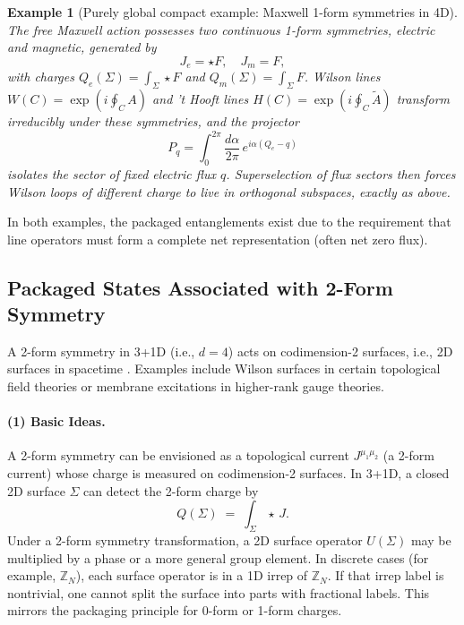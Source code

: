 \documentclass[12pt,a4paper]{article}
\newtheorem{example}{Example}
\begin{document}
\begin{example}[Purely global compact example: Maxwell 1-form symmetries in 4D]
	The free Maxwell action possesses two continuous 1-form symmetries, electric and magnetic, generated by 
	\[
	J_e = \star F,\quad J_m = F,
	\]
	with charges $\displaystyle Q_e(\Sigma)=\int_\Sigma \star F$ and $Q_m(\Sigma)=\int_\Sigma F$.  
	Wilson lines $W(C)=\exp(i\oint_C A)$ and ’t Hooft lines $H(C)=\exp(i\oint_C\tilde A)$ transform irreducibly under these symmetries, and the projector 
	\[
	P_q = \int_{0}^{2\pi}\frac{d\alpha}{2\pi}\,e^{i\alpha (Q_e-q)}
	\]
	isolates the sector of fixed electric flux $q$.  
	Superselection of flux sectors then forces Wilson loops of different charge to live in orthogonal subspaces, exactly as above.
\end{example}




In both examples, the packaged entanglements exist due to the requirement that line operators must form a complete net representation (often net zero flux).



\subsection{Packaged States Associated with 2-Form Symmetry}

A 2-form symmetry in 3+1D (i.e., $d=4$) acts on codimension-2 surfaces, i.e., 2D surfaces in spacetime \cite{KapustinSeiberg2014,Gaiotto2015,Polchinski1995,Witten1995,Kitaev2006,Tachikawa2020,BanksSeiberg2011}.
Examples include Wilson surfaces in certain topological field theories or membrane excitations in higher-rank gauge theories.


\paragraph{(1) Basic Ideas.}
A 2-form symmetry can be envisioned as a topological current $J^{\mu_1\mu_2}$ (a 2-form current) whose charge is measured on codimension-2 surfaces.
In 3+1D, a closed 2D surface $\Sigma$ can detect the 2-form charge by
\[
Q(\Sigma) \;=\; \int_{\Sigma} \star\,J.
\]
Under a 2-form symmetry transformation, a 2D surface operator $U(\Sigma)$ may be multiplied by a phase or a more general group element.
In discrete cases (for example, $\mathbb{Z}_N$), each surface operator is in a 1D irrep of $\mathbb{Z}_N$.
If that irrep label is nontrivial, one cannot split the surface into parts with fractional labels.
This mirrors the packaging principle for 0-form or 1-form charges.
\end{document}
